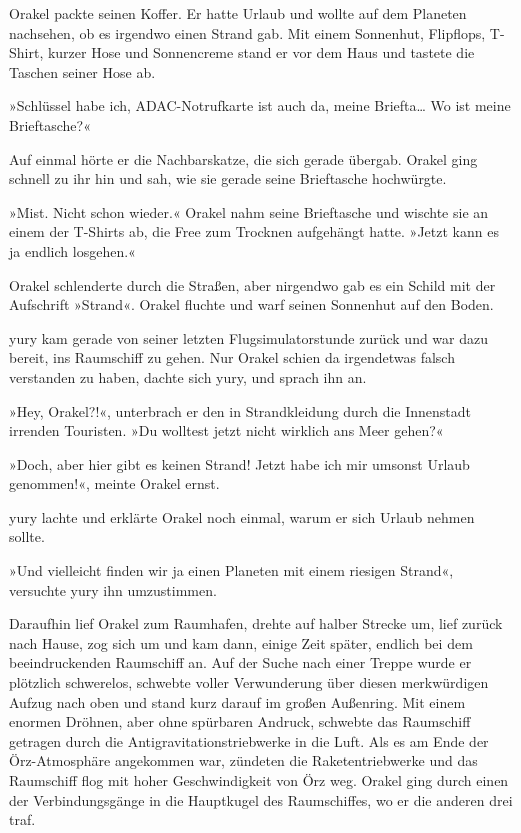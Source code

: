 Orakel packte seinen Koffer. Er hatte Urlaub und wollte auf dem Planeten nachsehen, ob es irgendwo einen Strand gab. Mit einem Sonnenhut, Flipflops, T-Shirt, kurzer Hose und Sonnencreme stand er vor dem Haus und tastete die Taschen seiner Hose ab.

»Schlüssel habe ich, ADAC-Notrufkarte ist auch da, meine Briefta… Wo ist meine Brieftasche?«

Auf einmal hörte er die Nachbarskatze, die sich gerade übergab. Orakel ging schnell zu ihr hin und sah, wie sie gerade seine Brieftasche hochwürgte.

»Mist. Nicht schon wieder.« Orakel nahm seine Brieftasche und wischte sie an einem der T-Shirts ab, die Free zum Trocknen aufgehängt hatte. »Jetzt kann es ja endlich losgehen.«

Orakel schlenderte durch die Straßen, aber nirgendwo gab es ein Schild mit der Aufschrift »Strand«. Orakel fluchte und warf seinen Sonnenhut auf den Boden.

yury kam gerade von seiner letzten Flugsimulatorstunde zurück und war dazu bereit, ins Raumschiff zu gehen. Nur Orakel schien da irgendetwas falsch verstanden zu haben, dachte sich yury, und sprach ihn an.

»Hey, Orakel?!«, unterbrach er den in Strandkleidung durch die Innenstadt irrenden Touristen. »Du wolltest jetzt nicht wirklich ans Meer gehen?«

»Doch, aber hier gibt es keinen Strand! Jetzt habe ich mir umsonst Urlaub genommen!«, meinte Orakel ernst.

yury lachte und erklärte Orakel noch einmal, warum er sich Urlaub nehmen sollte.

»Und vielleicht finden wir ja einen Planeten mit einem riesigen Strand«, versuchte yury ihn umzustimmen.

Daraufhin lief Orakel zum Raumhafen, drehte auf halber Strecke um, lief zurück nach Hause, zog sich um und kam dann, einige Zeit später, endlich bei dem beeindruckenden Raumschiff an. Auf der Suche nach einer Treppe wurde er plötzlich schwerelos, schwebte voller Verwunderung über diesen merkwürdigen Aufzug nach oben und stand kurz darauf im großen Außenring. Mit einem enormen Dröhnen, aber ohne spürbaren Andruck, schwebte das Raumschiff getragen durch die Antigravitationstriebwerke in die Luft. Als es am Ende der Örz-Atmosphäre angekommen war, zündeten die Raketentriebwerke und das Raumschiff flog mit hoher Geschwindigkeit von Örz weg. Orakel ging durch einen der Verbindungsgänge in die Hauptkugel des Raumschiffes, wo er die anderen drei traf.

